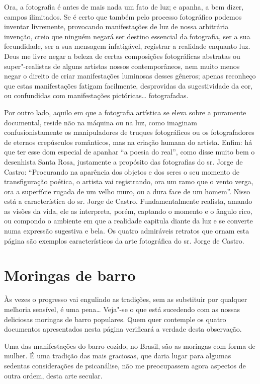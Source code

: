 Ora, a fotografia é antes de mais nada um fato de luz; e apanha, a bem
dizer, campos ilimitados. Se é certo que também pelo processo
fotográfico podemos inventar livremente, provocando manifestações de luz
de nossa arbitrária invenção, creio que ninguém negará ser destino
essencial da fotografia, ser a sua fecundidade, ser a sua mensagem
infatigável, registrar a realidade enquanto luz. Deus me livre negar a
beleza de certas composições fotográficas abstratas ou super"-realistas
de alguns artistas nossos contemporâneos, nem muito menos negar o
direito de criar manifestações luminosas desses gêneros; apenas
reconheço que estas manifestações fatigam facilmente, desprovidas da
sugestividade da cor, ou confundidas com manifestações pictóricas\ldots{}
fotografadas.

Por outro lado, aquilo em que a fotografia artística se eleva sobre a
puramente documental, reside não na máquina ou na luz, como imaginam
confusionistamente os manipuladores de truques fotográficos ou os
fotografadores de eternos crepúsculos românticos, mas na criação humana
do artista. Enfim: há que ter esse dom especial de apanhar ``a poesia do
real'', como disse muito bem o desenhista Santa Rosa, justamente a
propósito das fotografias do sr. Jorge de Castro: ``Procurando na
aparência dos objetos e dos seres o seu momento de transfiguração
poética, o artista vai registrando, ora um ramo que o vento verga, ora a
superfície rugada de um velho muro, ou a dura face de um homem''. Nisso
está a característica do sr. Jorge de Castro. Fundamentalmente realista,
amando as visões da vida, ele as interpreta, porém, captando o momento e
o ângulo rico, ou compondo o ambiente em que a realidade capitula diante
da luz e se converte numa expressão sugestiva e bela. Os quatro
admiráveis retratos que ornam esta página são exemplos característicos
da arte fotográfica do sr. Jorge de Castro.

\chapter{Moringas de barro}

Às vezes o progresso vai engulindo as tradições, sem as substituir por
qualquer melhoria sensível, é uma pena\ldots{} Veja"-se o que está sucedendo
com as nossas deliciosas moringas de barro populares. Quem quer
contemple os quatro documentos apresentados nesta página verificará a
verdade desta observação.

Uma das manifestações do barro cozido, no Brasil, são as moringas com
forma de mulher. É uma tradição das mais graciosas, que daria lugar para
algumas sedentas considerações de psicanálise, não me preocupassem agora
aspectos de outra ordem, desta arte secular.

